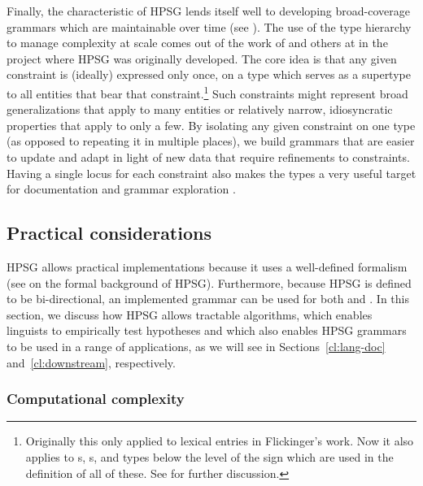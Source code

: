 \documentclass[output=paper
	        ,collection
	        ,collectionchapter
 	        ,biblatex
                ,babelshorthands
                ,newtxmath
                ,draftmode
                ,colorlinks, citecolor=brown
]{langscibook}
\begin{document}
Finally, the  characteristic of HPSG lends itself well to developing broad-coverage grammars which are maintainable over time (see \citealt{Syg:Win:11}). The use of the type hierarchy to manage complexity at scale comes out of the work of \citet{Flickinger87} and others
 at  in the project where HPSG was originally developed. The core idea is that any given constraint is (ideally) expressed only once, on a type which serves as a supertype to all entities that bear that constraint.\footnote{Originally this only applied to lexical entries in Flickinger's work. Now it also applies to s, s, and types below the level of the sign which are used in the definition of all of these. See  for further discussion.} Such constraints might represent broad generalizations that apply to many entities or relatively narrow, idiosyncratic properties that apply to only a few. By isolating any given constraint on one type (as opposed to repeating it in multiple places), we build grammars that are easier to update and adapt in light of new data that require refinements to constraints. Having a single locus for each constraint also makes the types a very useful target for documentation \citep{Hashimoto-etal:07} and grammar exploration \citep{Letcher:18}. 


\subsection{Practical considerations}
\label{cl:prac}

HPSG allows practical implementations because it uses a well-defined formalism (see  on the formal background of HPSG).
Furthermore, because HPSG is defined to be bi-directional,
an implemented grammar can be used for both  and .
In this section, we discuss how HPSG allows tractable algorithms,
which enables linguists to empirically test hypotheses
and which also enables HPSG grammars to be used in a range of applications,
as we will see in Sections~\ref{cl:lang-doc} and~\ref{cl:downstream}, respectively.

\subsubsection{Computational complexity}
\label{cl:prac:comp}
\end{document}
